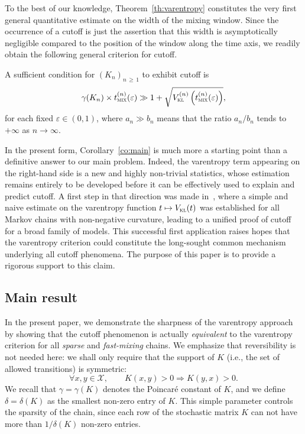 \documentclass[AHL,Unicode,longabstracts,published]{cedram}
\newcommand{\cX}{\mathcal{X}}
\newcommand{\vkl}{V_{\textsc{kl}}}
\newcommand{\tmix}{t_{\textsc{mix}}}
\let\oldforall\forall
\renewcommand*{\forall}{\mathrel{\oldforall}}
\begin{document}
To the best of our knowledge, Theorem~\ref{th:varentropy} constitutes the very first general quantitative estimate on the width of the mixing window. Since the occurrence of a cutoff is just the assertion that this width is asymptotically negligible compared to the position of the window along the time axis, we readily obtain the following general criterion for cutoff.

\begin{coro}\label{co:main}
A sufficient condition for $(K_n)_{n\,\ge\,1}$ to exhibit cutoff is
\begin{equation}\label{VC}
\gamma(K_n)\times \tmix^{(n)}(\varepsilon) \gg 1+\sqrt{\vkl^{(n)}\left(\tmix^{(n)}(\varepsilon)\right)},
\end{equation}
for each fixed $\varepsilon\in (0,1)$, where $a_n\gg b_n$ means that the ratio $a_n/b_n$ tends to $+\infty$ as $n\to\infty$.
\end{coro}

In the present form, Corollary~\ref{co:main} is much more a starting point than a definitive answer to our main problem. Indeed, the varentropy term appearing on the right-hand side is a new and highly non-trivial statistics, whose estimation remains entirely to be developed before it can be effectively used to explain and predict cutoff. A first step in that direction was made in~\cite{arxiv.2102.05597}, where a simple and naive estimate on the varentropy function $t\mapsto \vkl(t)$ was established for all Markov chains with non-negative curvature, leading to a unified proof of cutoff for a broad family of models. This successful first application raises hopes that the varentropy criterion could constitute the long-sought common mechanism underlying all cutoff phenomena. The purpose of this paper is to provide a rigorous support to this claim.


\subsection{Main result}

In the present paper, we demonstrate the sharpness of the varentropy approach by showing that the cutoff phenomenon is actually \emph{equivalent} to the varentropy criterion for all \emph{sparse} and \emph{fast-mixing} chains. We emphasize that reversibility is not needed here: we shall only require that the support of $K$ (i.e., the set of allowed transitions) is symmetric:
\begin{equation}\label{support}
\forall x,y\in\cX,\qquad K(x,y)>0 \Longrightarrow K(y,x)>0.
\end{equation}
We recall that $\gamma=\gamma(K)$ denotes the Poincar\'e constant of $K$, and we define $\delta=\delta(K)$ as the smallest non-zero entry of $K$. This simple parameter controls the sparsity of the chain, since each row of the stochastic matrix $K$ can not have more than $1/\delta(K)$ non-zero entries.
\end{document}

